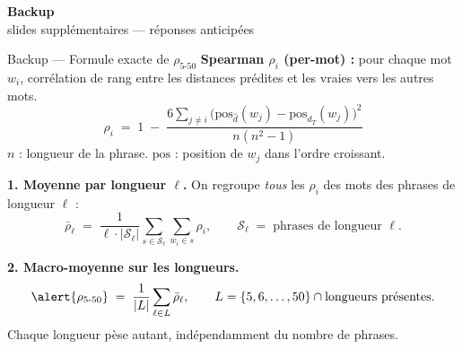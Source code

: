 \documentclass[aspectratio=169,11pt]{beamer}
\begin{document}
\begin{frame}[plain]
  \centering
  \vspace*{\fill}
  {\Huge\textbf{\textcolor{accent}{Backup}}}\\[0.6cm]
  {\Large slides supplémentaires --- réponses anticipées}
  \vfill
\end{frame}

\begin{frame}{Backup --- Formule exacte de $\rho_{5\text{-}50}$}
  \textbf{Spearman $\rho_i$ (per-mot) :} pour chaque mot $w_i$,
  corr\'elation de rang entre les distances pr\'edites et les vraies
  vers les autres mots.
  \[
    \rho_i \;=\; 1 \;-\; \frac{6 \sum_{j \neq i}
      \bigl(\mathrm{pos}_{\hat d}(w_j) - \mathrm{pos}_{d_T}(w_j)\bigr)^2}
                                  {n(n^2-1)}
  \]
  $n$ : longueur de la phrase. \quad
  $\mathrm{pos}$ : position de $w_j$ dans l'ordre croissant.

  \medskip
  \textbf{1. Moyenne par longueur $\ell$.} On regroupe \emph{tous}
  les $\rho_i$ des mots des phrases de longueur $\ell$ :
  \[
    \bar\rho_\ell \;=\; \frac{1}{\ell \cdot |\mathcal{S}_\ell|}
    \sum_{s \in \mathcal{S}_\ell} \sum_{w_i \in s} \rho_i,
    \qquad \mathcal{S}_\ell \;=\; \text{phrases de longueur }\ell.
  \]

  \textbf{2. Macro-moyenne sur les longueurs.}
  \[
    \alert{\rho_{5\text{-}50}} \;=\; \frac{1}{|L|} \sum_{\ell \in L} \bar\rho_\ell,
    \qquad L = \{5, 6, \ldots, 50\} \cap \text{longueurs pr\'esentes.}
  \]
  Chaque longueur p\`ese autant, ind\'ependamment du nombre de phrases.
\end{frame}
\end{document}
